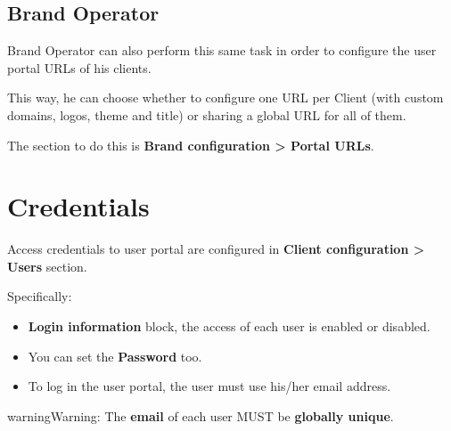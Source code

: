 \documentclass[letterpaper,10pt,english]{sphinxmanual}
\begin{document}
\subsection{Brand Operator}
\label{user_portal/urls:brand-operator}
Brand Operator can also perform this same task in order to configure the user
portal URLs of his clients.

This way, he can choose whether to configure one URL per Client (with custom
domains, logos, theme and title) or sharing a global URL for all of them.

The section to do this is \textbf{Brand configuration \textgreater{} Portal URLs}.


\section{Credentials}
\label{user_portal/credentials:credentials}\label{user_portal/credentials::doc}
Access credentials to user portal are configured in \textbf{Client configuration \textgreater{}
Users} section.

Specifically:
\begin{itemize}
\item {} 
\textbf{Login information} block, the access of each user is enabled or disabled.

\item {} 
You can set the \textbf{Password} too.

\item {} 
To log in the user portal, the user must use his/her email address.

\end{itemize}

\begin{notice}{warning}{Warning:}
The \textbf{email} of each user MUST be \textbf{globally unique}.
\end{notice}
\end{document}
